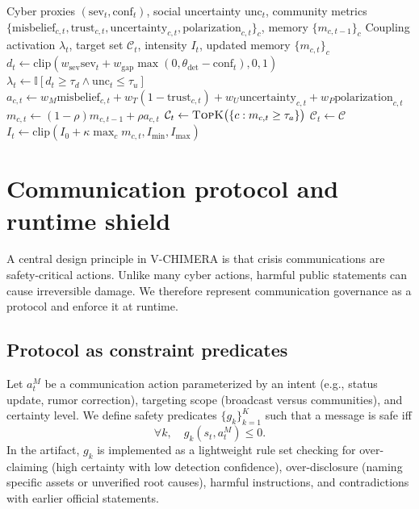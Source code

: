 \documentclass[biomimetics,article,submit,pdftex,moreauthors]{Definitions/mdpi}
\newcommand{\model}{V-CHIMERA}
\begin{document}
\begin{algorithm}[t]
\caption{Immune-gated coupling regulator (IGC) at time $t$}
\label{alg:igc}
\begin{algorithmic}[1]
\Require Cyber proxies $(\mathrm{sev}_t,\mathrm{conf}_t)$, social uncertainty $\mathrm{unc}_t$, community metrics $\{\mathrm{misbelief}_{c,t},\mathrm{trust}_{c,t},\mathrm{uncertainty}_{c,t},\mathrm{polarization}_{c,t}\}_c$, memory $\{m_{c,t-1}\}_c$
\Ensure Coupling activation $\lambda_t$, target set $\mathcal{C}_t$, intensity $I_t$, updated memory $\{m_{c,t}\}_c$
\State $d_t \leftarrow \mathrm{clip}(w_{\mathrm{sev}}\mathrm{sev}_t + w_{\mathrm{gap}}\max(0,\theta_{\mathrm{det}}-\mathrm{conf}_t),0,1)$
\State $\lambda_t \leftarrow \mathbb{I}[d_t \ge \tau_d \wedge \mathrm{unc}_t \le \tau_u]$
  \State $a_{c,t} \leftarrow w_M\mathrm{misbelief}_{c,t} + w_T(1-\mathrm{trust}_{c,t}) + w_U\mathrm{uncertainty}_{c,t} + w_P\mathrm{polarization}_{c,t}$
  \State $m_{c,t} \leftarrow (1-\rho)m_{c,t-1} + \rho a_{c,t}$
\EndFor
\State $\mathcal{C}_t \leftarrow \textsc{TopK}\big(\{c : m_{c,t}\ge\tau_a\}\big)$
  \State $\mathcal{C}_t \leftarrow \mathcal{C}$ 
\EndIf
\State $I_t \leftarrow \mathrm{clip}(I_0 + \kappa\max_c m_{c,t}, I_{\min}, I_{\max})$
\end{algorithmic}
\end{algorithm}


\section{Communication protocol and runtime shield}
A central design principle in \model{} is that crisis communications are safety-critical actions. Unlike many cyber actions, harmful public statements can cause irreversible damage. We therefore represent communication governance as a protocol and enforce it at runtime.

\subsection{Protocol as constraint predicates}
Let $a^M_t$ be a communication action parameterized by an intent (e.g., status update, rumor correction), targeting scope (broadcast versus communities), and certainty level. We define safety predicates $\{g_k\}_{k=1}^K$ such that a message is safe iff
\begin{equation}
\forall k,\quad g_k(s_t, a^M_t) \le 0.
\end{equation}
In the artifact, $g_k$ is implemented as a lightweight rule set checking for over-claiming (high certainty with low detection confidence), over-disclosure (naming specific assets or unverified root causes), harmful instructions, and contradictions with earlier official statements.
\end{document}
